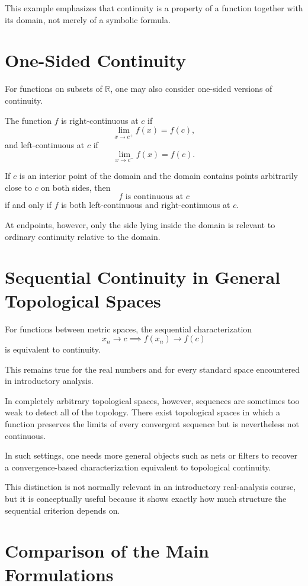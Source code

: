 \documentclass{essay}
\begin{document}
This example emphasizes that continuity is a property of a function together with its domain, not merely of a symbolic formula.

\section{One-Sided Continuity}

For functions on subsets of $\mathbb R$, one may also consider one-sided versions of continuity.

The function $f$ is right-continuous at $c$ if
\[
\lim_{x\to c^+}f(x)=f(c),
\]
and left-continuous at $c$ if
\[
\lim_{x\to c^-}f(x)=f(c).
\]

If $c$ is an interior point of the domain and the domain contains points arbitrarily close to $c$ on both sides, then
\[
f\text{ is continuous at }c
\]
if and only if $f$ is both left-continuous and right-continuous at $c$.

At endpoints, however, only the side lying inside the domain is relevant to ordinary continuity relative to the domain.

\section{Sequential Continuity in General Topological Spaces}

For functions between metric spaces, the sequential characterization
\[
x_n\to c
\implies
f(x_n)\to f(c)
\]
is equivalent to continuity.

This remains true for the real numbers and for every standard space encountered in introductory analysis.

In completely arbitrary topological spaces, however, sequences are sometimes too weak to detect all of the topology. There exist topological spaces in which a function preserves the limits of every convergent sequence but is nevertheless not continuous.

In such settings, one needs more general objects such as nets or filters to recover a convergence-based characterization equivalent to topological continuity.

This distinction is not normally relevant in an introductory real-analysis course, but it is conceptually useful because it shows exactly how much structure the sequential criterion depends on.

\section{Comparison of the Main Formulations}
\end{document}
